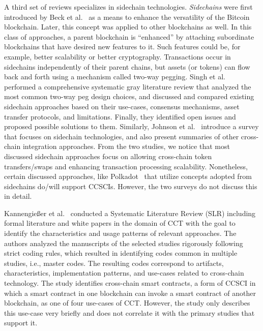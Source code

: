 \documentclass[review]{elsarticle}
\begin{document}
A third set of reviews specializes in sidechain technologies.
\textit{Sidechains} were first introduced by Beck et al.~\cite{back2014sidechains} as a means to enhance the versatility of the Bitcoin blockchain.
Later, this concept was applied to other blockchains as well.
In this class of approaches, a parent blockchain is \enquote{enhanced} by attaching subordinate blockchains that have desired new features to it. 
Such features could be, for example, better scalability or better cryptography.
Transactions occur in sidechains independently of their parent chains, but assets (or tokens) can flow back and forth using a mechanism called two-way pegging.
Singh et al.~\cite{Singh2020Sidechains} performed a comprehensive systematic gray literature review that analyzed the most common two-way peg design choices, and discussed and compared existing sidechain approaches based on their use-cases, consensus mechanisms, asset transfer protocols, and limitations.
Finally, they identified open issues and proposed possible solutions to them.
Similarly, Johnson et al.~\cite{Johnson2019Sidechains} introduce a survey that focuses on sidechain technologies, and also present summaries of other cross-chain integration approaches.
From the two studies, we notice that most discussed sidechain approaches focus on allowing cross-chain token transfers/swaps and enhancing transaction processing scalability.
Nonetheless, certain discussed approaches, like Polkadot~\cite{Wood2016Polkadot} that utilize concepts adopted from sidechains do/will support CCSCIs.
However, the two surveys do not discuss this in detail.

Kannengie\ss{}er et al.~\cite{Kannengiesser2020} conducted a Systematic Literature Review (SLR) including formal literature and white papers in the domain of CCT with the goal to identify the characteristics and usage patterns of relevant approaches.
The authors analyzed the manuscripts of the selected studies rigorously following strict coding rules, which resulted in identifying codes common in multiple studies, i.e., master codes.
The resulting codes correspond to artifacts, characteristics, implementation patterns, and use-cases related to cross-chain technology.
The study identifies cross-chain smart contracts, a form of CCSCI in which a smart contract in one blockchain can invoke a smart contract of another blockchain, as one of four use-cases of CCT.
However, the study only describes this use-case very briefly and does not correlate it with the primary studies that support it.
\end{document}
